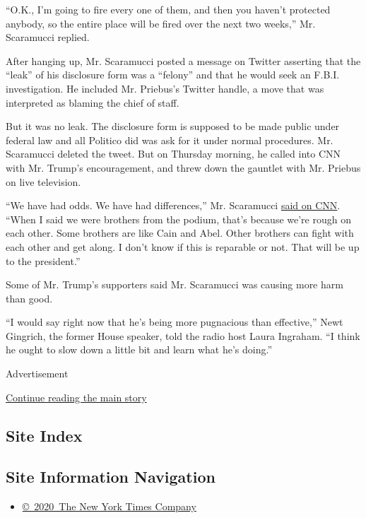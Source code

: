 ``O.K., I'm going to fire every one of them, and then you haven't
protected anybody, so the entire place will be fired over the next two
weeks,'' Mr. Scaramucci replied.

After hanging up, Mr. Scaramucci posted a message on Twitter asserting
that the ``leak'' of his disclosure form was a ``felony'' and that he
would seek an F.B.I. investigation. He included Mr. Priebus's Twitter
handle, a move that was interpreted as blaming the chief of staff.

But it was no leak. The disclosure form is supposed to be made public
under federal law and all Politico did was ask for it under normal
procedures. Mr. Scaramucci deleted the tweet. But on Thursday morning,
he called into CNN with Mr. Trump's encouragement, and threw down the
gauntlet with Mr. Priebus on live television.

``We have had odds. We have had differences,'' Mr. Scaramucci
\href{https://twitter.com/NewDay/status/890532262030213120}{said on
CNN}. ``When I said we were brothers from the podium, that's because
we're rough on each other. Some brothers are like Cain and Abel. Other
brothers can fight with each other and get along. I don't know if this
is reparable or not. That will be up to the president.''

Some of Mr. Trump's supporters said Mr. Scaramucci was causing more harm
than good.

``I would say right now that he's being more pugnacious than
effective,'' Newt Gingrich, the former House speaker, told the radio
host Laura Ingraham. ``I think he ought to slow down a little bit and
learn what he's doing.''

Advertisement

\protect\hyperlink{after-bottom}{Continue reading the main story}

\hypertarget{site-index}{%
\subsection{Site Index}\label{site-index}}

\hypertarget{site-information-navigation}{%
\subsection{Site Information
Navigation}\label{site-information-navigation}}

\begin{itemize}
\tightlist
\item
  \href{https://help.nytimes.com/hc/en-us/articles/115014792127-Copyright-notice}{©~2020~The
  New York Times Company}
\end{itemize}

